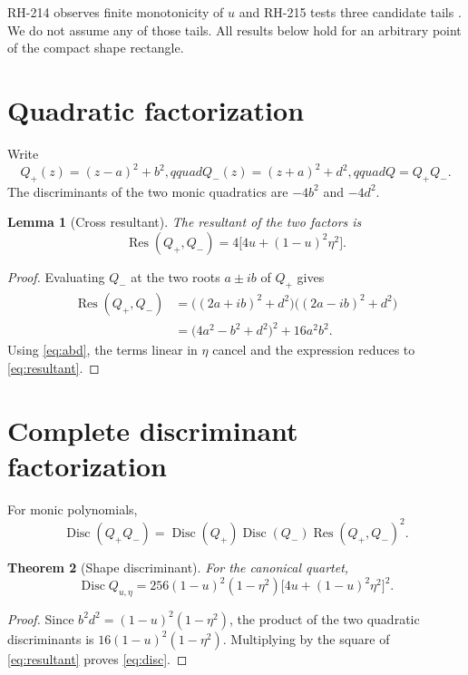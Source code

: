 \documentclass[12pt]{article}
\newtheorem{theorem}{Theorem}[section]\newtheorem{proposition}[theorem]{Proposition}
\newtheorem{lemma}[theorem]{Lemma}\newtheorem{corollary}[theorem]{Corollary}
\theoremstyle{remark}\newtheorem{remark}[theorem]{Remark}
\begin{document}
RH-214 observes finite monotonicity of $u$ and RH-215 tests three candidate
tails \citep{WangRH214,WangRH215}.  We do not assume any of those tails.  All
results below hold for an arbitrary point of the compact shape rectangle.

\section{Quadratic factorization}

Write
\begin{equation}\label{eq:factors}
 Q_+(z)=(z-a)^2+b^2,qquad
 Q_-(z)=(z+a)^2+d^2,qquad Q=Q_+Q_-.
\end{equation}
The discriminants of the two monic quadratics are $-4b^2$ and $-4d^2$.

\begin{lemma}[Cross resultant]\label{lem:resultant}
The resultant of the two factors is
\begin{equation}\label{eq:resultant}
 \operatorname{Res}(Q_+,Q_-)
 =4\bigl[4u+(1-u)^2\eta^2\bigr].
\end{equation}
\end{lemma}
\begin{proof}
Evaluating $Q_-$ at the two roots $a\pm ib$ of $Q_+$ gives
\begin{align}
 \operatorname{Res}(Q_+,Q_-)
 &=\bigl((2a+ib)^2+d^2\bigr)
   \bigl((2a-ib)^2+d^2\bigr)\\
 &=\bigl(4a^2-b^2+d^2\bigr)^2+16a^2b^2.
\end{align}
Using \eqref{eq:abd}, the terms linear in $\eta$ cancel and the expression
reduces to \eqref{eq:resultant}.
\end{proof}

\section{Complete discriminant factorization}

For monic polynomials,
\begin{equation}
 \operatorname{Disc}(Q_+Q_-)
 =\operatorname{Disc}(Q_+)\operatorname{Disc}(Q_-)
  \operatorname{Res}(Q_+,Q_-)^2.
\end{equation}

\begin{theorem}[Shape discriminant]\label{thm:disc}
For the canonical quartet,
\begin{equation}\label{eq:disc}
 \boxed{
 \operatorname{Disc}Q_{u,\eta}
 =256(1-u)^2(1-\eta^2)
 \bigl[4u+(1-u)^2\eta^2\bigr]^2.}
\end{equation}
\end{theorem}
\begin{proof}
Since $b^2d^2=(1-u)^2(1-\eta^2)$, the product of the two quadratic
discriminants is $16(1-u)^2(1-\eta^2)$.  Multiplying by the square of
\eqref{eq:resultant} proves \eqref{eq:disc}.
\end{proof}
\end{document}
